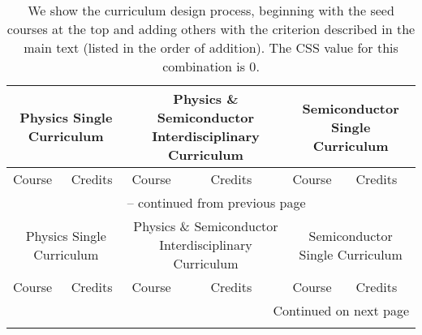\documentclass{bmcart}
\begin{document}
\begin{landscape}
\label{table:physics_chemistry_combination}

\setlength{\tabcolsep}{5pt} %
\renewcommand{\arraystretch}{1.2} %
\begin{longtable}{p{3.5cm}|p{1cm}|p{7cm}|p{1cm}|p{7cm}|p{1cm}}
\caption{We show the curriculum design process, beginning with the seed courses at the top and adding others with the criterion described in the main text (listed in the order of addition). The CSS value for this combination is $0$.} \\
\hline\hline
\multicolumn{2}{c|}{\scriptsize Physics Single Curriculum} & \multicolumn{2}{c|}{\scriptsize Physics \& Semiconductor Interdisciplinary Curriculum} & \multicolumn{2}{c}{\scriptsize Semiconductor Single Curriculum} \\
\hline
\scriptsize Course & \scriptsize Credits & \scriptsize Course & \scriptsize Credits & \scriptsize Course & \scriptsize Credits \\
\hline
\endfirsthead

\multicolumn{6}{c}{{\tablename\ \thetable{} -- continued from previous page}} \\
\hline
\multicolumn{2}{c|}{\scriptsize Physics Single Curriculum} & \multicolumn{2}{c|}{\scriptsize Physics \& Semiconductor Interdisciplinary Curriculum} & \multicolumn{2}{c}{\scriptsize Semiconductor Single Curriculum} \\
\hline
\scriptsize Course & \scriptsize Credits & \scriptsize Course & \scriptsize Credits & \scriptsize Course & \scriptsize Credits \\
\hline
\endhead

\hline \multicolumn{6}{|r|}{{Continued on next page}} \\ \hline
\endfoot

\hline\hline
\endlastfoot


\end{longtable}
\end{landscape}
\end{document}
